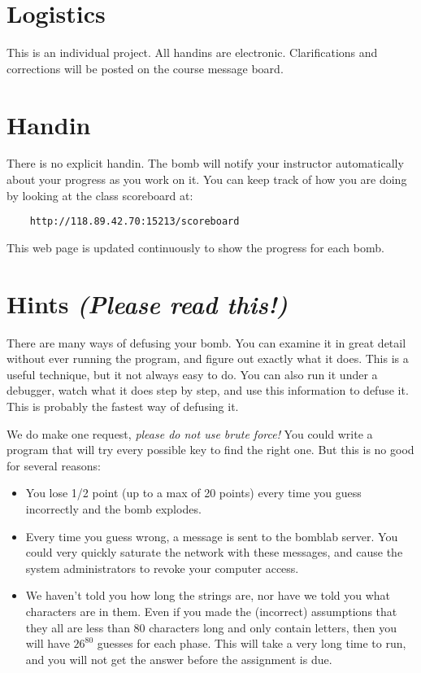 \documentclass[11pt]{article}
\begin{document}
\section*{Logistics}

This is an individual project. All handins are electronic.
Clarifications and corrections will be posted on the course message
board.


\section*{Handin}

There is no explicit handin. The bomb will notify your instructor
automatically about your progress as you work on it.  You can keep
track of how you are doing by looking at the class scoreboard at:

\begin{verbatim}
    http://118.89.42.70:15213/scoreboard
\end{verbatim}

This web page is updated continuously to show the progress for
each bomb.

\section*{Hints {\em (Please read this!)}}

There are many ways of defusing your bomb.  You can examine it in
great detail without ever running the program, and figure out exactly
what it does.  This is a useful technique, but it not always easy to
do.  You can also run it under a debugger, watch what it does step
by step, and use this information to defuse it.  This is probably the
fastest way of defusing it.

We do make one request, {\em please do not use brute force!}  You could
write a program that will try every possible key to find the right
one.  But this is no good for several reasons:
\begin{itemize}
\item You lose 1/2 point (up to a max of 20 points) 
every time you guess incorrectly and the bomb explodes.  

\item Every time you guess wrong, a message is sent to the bomblab server.  
You could very quickly saturate the network with these messages, and cause
the system administrators to revoke your computer access.

\item We haven't told you how long the strings are, nor have we told you
what characters are in them.  Even if you made the (incorrect) assumptions
that they all are less than 80 characters long and only contain
letters, then you will have $26^{80}$ guesses for each phase.  This will
take a very long time to run, and you will not get the answer before
the assignment is due.
\end{itemize}
\end{document}
